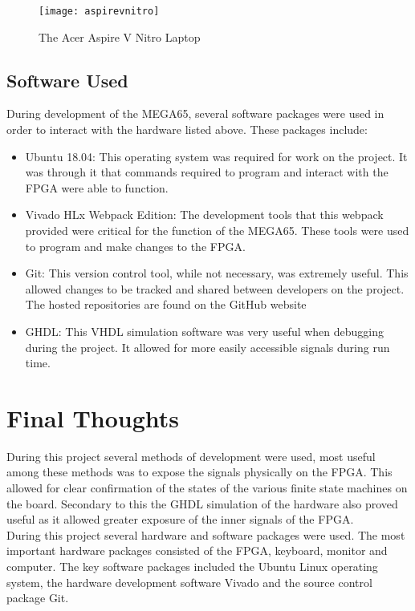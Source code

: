 \begin{figure}
  \centering
  \texttt{[image: aspirevnitro]}
  \caption{The Acer Aspire V Nitro Laptop}
  \label{fig:aspirevnitro}
\end{figure}

\subsection{Software Used}

\label{Ch3 Sec2 Sub2}

During development of the MEGA65, several software packages were used in order to interact with the hardware listed above. These packages include:\\

\begin{itemize}
\item{Ubuntu 18.04: This operating system was required for work on the project. It was through it that commands required to program and interact with the FPGA were able to function.}
\item{Vivado HLx Webpack Edition: The development tools that this webpack provided were critical for the function of the MEGA65. These tools were used to program and make changes to the FPGA.}
\item{Git: This version control tool, while not necessary, was extremely useful. This allowed changes to be tracked and shared between developers on the project. The hosted repositories are found on the GitHub website}
\item{GHDL: This VHDL simulation software was very useful when debugging during the project. It allowed for more easily accessible signals during run time.}
\end{itemize}

\section{Final Thoughts}

During this project several methods of development were used, most useful among these methods was to expose the signals physically on the FPGA. This allowed for clear confirmation of the states of the various finite state machines on the board. Secondary to this the GHDL simulation of the hardware also proved useful as it allowed greater exposure of the inner signals of the FPGA.\\
During this project several hardware and software packages were used. The most important hardware packages consisted of the FPGA, keyboard, monitor and computer. The key software packages included the Ubuntu Linux operating system, the hardware development software Vivado and the source control package Git.
